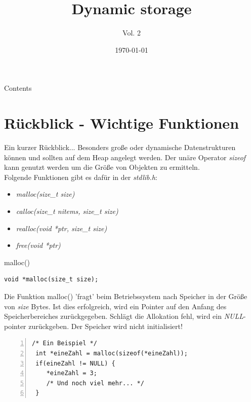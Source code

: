 


\title{Dynamic storage}
\subtitle{Vol. 2}
\date{\today}

\usetikzlibrary{tikzmark}
\usetikzlibrary{arrows}
\usetikzlibrary{decorations.pathmorphing}



\maketitle

\begin{frame}{Contents}
	\tableofcontents
\end{frame}

\section{Rückblick - Wichtige Funktionen}

\begin{frame}[fragile]{Ein kurzer Rückblick...}
Besonders große oder dynamische Datenstrukturen können und sollten auf dem Heap angelegt werden. Der unäre Operator \textit{sizeof} kann genutzt werden um die Größe von Objekten zu ermitteln. 
\\
\bigskip
Folgende Funktionen gibt es dafür in der \textit{stdlib.h}:
	\begin{itemize}
		\item \textit{malloc(size\_t size)}
		\item \textit{calloc(size\_t nitems, size\_t size)}
		\item \textit{realloc(void *ptr, size\_t size)}
		\item \textit{free(void *ptr)}
	\end{itemize}
\end{frame}


\begin{frame}[fragile]{malloc()}
    \begin{lstlisting}[numbers=none]
void *malloc(size_t size);    \end{lstlisting}
Die Funktion malloc() 'fragt' beim Betriebssystem nach Speicher in der Größe von \textit{size} Bytes. Ist dies erfolgreich, wird ein Pointer auf den Anfang des Speicherbereiches zurückgegeben. Schlägt die Allokation fehl, wird ein \textit{NULL}-pointer zurückgeben. Der Speicher wird nicht initialisiert!
    \begin{lstlisting}[numbers=left]
/* Ein Beispiel */
 int *eineZahl = malloc(sizeof(*eineZahl));
 if(eineZahl != NULL) {
    *eineZahl = 3;
    /* Und noch viel mehr... */
 }\end{lstlisting}
\end{frame}

